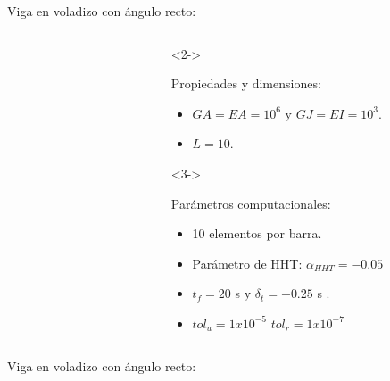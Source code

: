 \documentclass[
  aspectratio=169,
]{beamer}
\begin{document}
\begin{small}
\begin{frame}[t]{Viga en voladizo con ángulo recto:}
\begin{columns}[T,onlytextwidth]
\begin{column}{.58\textwidth}
\begin{minipage}{\textwidth}
\begin{figure}[htbp]
					\def\svgwidth{35mm}
					
				\end{figure}
		\end{minipage}  
		\end{column}
		\begin{column}{.4\textwidth}
			\begin{onlyenv}<2->
				\begin{minipage}{\textwidth}
					\vspace{-1cm}
					\begin{block}{Propiedades y dimensiones:}
						\begin{itemize}
							\item $GA= EA=10^6$ y $GJ = EI =10^3$.  
							\item $L=10$.
						\end{itemize}	 
					\end{block}
				\end{minipage}
			\end{onlyenv}
			\begin{onlyenv}<3->
				\begin{minipage}{\textwidth}
					\begin{block}{Parámetros computacionales:}
						\begin{itemize}
							\item 10 elementos por barra.
							\item Parámetro de HHT: $\alpha_{HHT}=-0.05$
							\item $t_f=20$ s y $\delta_t =-0.25$ s .
							\item $tol_u =1x10^{-5} $ $tol_r =1$$x10^{-7} $  
						\end{itemize}	 
					\end{block}
				\end{minipage}
			\end{onlyenv}
		\end{column}
	\end{columns}
\end{frame}
\begin{frame}{Viga en voladizo con ángulo recto:}
	\begin{figure}[htbp]
		\centering
		\def\svgwidth{80mm}
		
	\end{figure}

\end{frame}
\end{small}
\end{document}
